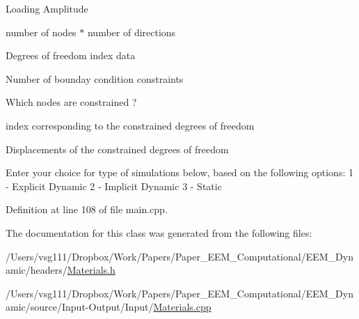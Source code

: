 Loading Amplitude

number of nodes $\ast$ number of directions

Degrees of freedom index data

Number of bounday condition constraints

Which nodes are constrained ?

index corresponding to the constrained degrees of freedom

Displacements of the constrained degrees of freedom

Enter your choice for type of simulations below, based on the following options\+: 1 -\/ Explicit Dynamic 2 -\/ Implicit Dynamic 3 -\/ Static

Definition at line 108 of file main.\+cpp.



The documentation for this class was generated from the following files\+:\begin{DoxyCompactItemize}
\item 
/\+Users/vsg111/\+Dropbox/\+Work/\+Papers/\+Paper\+\_\+\+E\+E\+M\+\_\+\+Computational/\+E\+E\+M\+\_\+\+Dynamic/headers/\hyperlink{_materials_8h}{Materials.\+h}\item 
/\+Users/vsg111/\+Dropbox/\+Work/\+Papers/\+Paper\+\_\+\+E\+E\+M\+\_\+\+Computational/\+E\+E\+M\+\_\+\+Dynamic/source/\+Input-\/\+Output/\+Input/\hyperlink{_materials_8cpp}{Materials.\+cpp}\end{DoxyCompactItemize}
